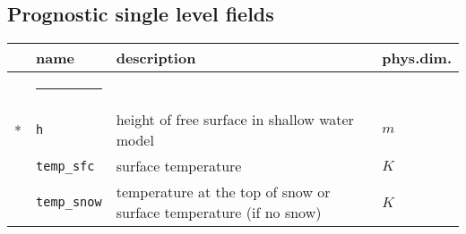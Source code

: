 %

\subsection{Prognostic single level fields}
\begin{tabular}{l l l l}  
& \parbox{.15\textwidth}{name} & \parbox{.65\textwidth}{description} & 
\parbox{.1\textwidth}{phys.dim.} \\ \hline  
& \rule{4ex}{0pt} & \\[-10pt]  
* & \texttt{h}   & height of free surface in shallow water model & $m$ \\  
 & \texttt{temp\_sfc}   & surface temperature & $K$ \\  
 & \texttt{temp\_snow}   & temperature at the top of snow or surface 
temperature (if no snow) & $K$ \\[5pt]  
\end{tabular}  
